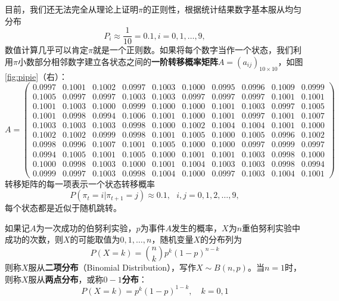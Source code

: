 \begin{example}[圆周率与统计]
目前，我们还无法完全从理论上证明$\pi$的正则性，根据统计结果数字基本服从均匀分布
\[
    P_i \approx \frac{1}{10} = 0.1, i = 0, 1,\ldots,9,
\]
数值计算几乎可以肯定$\pi$就是一个正则数。如果将每个数字当作一个状态，我们利用$\pi$小数部分相邻数字建立各状态之间的\textbf{一阶转移概率矩阵}$A=(a_{ij})_{10\times 10}$，如图\ref{fig:pipie}（右）：
\[
A=
\begin{pmatrix}
    0.0997 & 0.1001 & 0.1002 & 0.0997 & 0.1003 & 0.1000 & 0.0995 & 0.0996 & 0.1009 & 0.0999\\
    0.1005 & 0.0997 & 0.0997 & 0.1003 & 0.1003 & 0.0997 & 0.0997 & 0.0997 & 0.1001 & 0.1001\\
    0.1001 & 0.1003 & 0.1000 & 0.0999 & 0.1000 & 0.1000 & 0.1001 & 0.1003 & 0.0997 & 0.1005\\
    0.1001 & 0.0998 & 0.0994 & 0.1006 & 0.1001 & 0.1000 & 0.1001 & 0.0997 & 0.1001 & 0.1007\\
    0.1003 & 0.1003 & 0.1003 & 0.0998 & 0.1000 & 0.1002 & 0.1004 & 0.1004 & 0.1001 & 0.1000\\
    0.1002 & 0.1002 & 0.0999 & 0.0998 & 0.1001 & 0.1005 & 0.1000 & 0.1005 & 0.0996 & 0.1002\\
    0.0998 & 0.0996 & 0.1007 & 0.1001 & 0.1005 & 0.1000 & 0.1000 & 0.0997 & 0.0999 & 0.0997\\
    0.0994 & 0.1005 & 0.1001 & 0.1005 & 0.1000 & 0.1001 & 0.1001 & 0.1003 & 0.0998 & 0.1000\\
    0.1000 & 0.0998 & 0.1003 & 0.1000 & 0.1001 & 0.1004 & 0.1003 & 0.1003 & 0.0998 & 0.0994\\
    0.0999 & 0.0997 & 0.1003 & 0.0998 & 0.1004 & 0.1000 & 0.0997 & 0.1003 & 0.1004 & 0.1001
\end{pmatrix}
\]
转移矩阵的每一项表示一个状态转移概率
\[
    P(\pi_t = i|\pi_{t+1} = j)\approx 0.1,~~~i,j = 0,1,2,\ldots,9,
\]
每个状态都是近似于随机跳转。
\end{example}

\begin{definition}[二项分布]
如果记$A$为一次成功的伯努利实验，$p$为事件$A$发生的概率，$X$为$n$重伯努利实验中成功的次数，则$X$的可能取值为$0,1,\ldots,n$，随机变量$X$的分布列为
\begin{equation}
    P(X=k) = \binom{n}{k} p^k (1-p)^{n-k}
\end{equation}
则称$X$服从\textbf{二项分布}（Binomial Distribution），写作$X\sim B(n,p)$。当$n=1$时，则称$X$服从\textbf{两点分布}，或称\textbf{$0-1$分布}：
\begin{equation}
    P(X=k) = p^k (1-p)^{1-k}, \quad k = 0, 1
\end{equation}
\end{definition}

